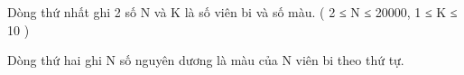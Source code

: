 Dòng thứ nhất ghi 2 số N và K là số viên bi và số màu. ( 2 ≤ N ≤ 20000, 1 ≤ K ≤ 10 )  

   Dòng thứ hai ghi N số nguyên dương là màu của N viên bi theo thứ tự.  

\